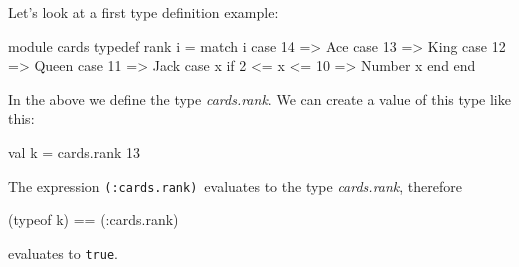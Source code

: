 \documentclass[11pt]{amsart}
\newcommand{\babelsrc}[1] {\lstinline!#1!}
\begin{document}
Let's look at a first type definition example:
\begin{babellisting}
module cards
  typedef rank i = 
    match i 
      case 14 => Ace
      case 13 => King
      case 12 => Queen
      case 11 => Jack
      case x if 2 <= x <= 10 => Number x
    end
end
\end{babellisting}
In the above we define the type \emph{cards.rank}. We can create a value of this type like this:
\begin{babellisting}
val k = cards.rank 13
\end{babellisting}
The expression \babelsrc{(:cards.rank)}\ evaluates to the type \emph{cards.rank}, therefore 
\begin{babellisting}
(typeof k) == (:cards.rank)
\end{babellisting}
evaluates to \babelsrc{true}. 
\end{document}
